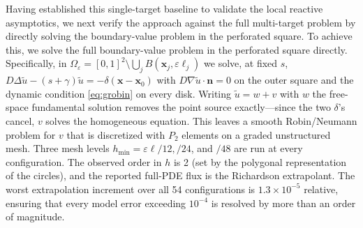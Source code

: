 \documentclass[pdflatex,sn-mathphys-num]{sn-jnl}
\numberwithin{equation}{section}
\theoremstyle{thmstyleone}%
\theoremstyle{definition}
\theoremstyle{remark}
\begin{document}
Having established this single-target baseline to validate the local reactive asymptotics, we next verify the approach against the full multi-target problem by directly solving the boundary-value problem in the perforated square. To achieve this, we solve the full boundary-value problem in the perforated square directly. Specifically, in $\Omega_\varepsilon=[0,1]^2\setminus\bigcup_j B(\mathbf x_j,\varepsilon\ell_j)$ we solve, at fixed $s$, $D\Delta\widetilde u-(s+\gamma)\widetilde u=-\delta(\mathbf x-\mathbf x_0)$ with $D\nabla\widetilde u\cdot\mathbf n=0$ on the outer square and the dynamic condition \eqref{eq:grobin} on every disk. Writing $\widetilde u=w+v$ with $w$ the free-space fundamental solution removes the point source exactly—since the two $\delta$'s cancel, $v$ solves the homogeneous equation. This leaves a smooth Robin/Neumann problem for $v$ that is discretized with $P_2$ elements on a graded unstructured mesh. Three mesh levels $h_{\min}=\varepsilon\ell/12, /24$, and $/48$ are run at every configuration. The observed order in $h$ is 2 (set by the polygonal representation of the circles), and the reported full-PDE flux is the Richardson extrapolant. The worst extrapolation increment over all 54 configurations is $1.3\times10^{-5}$ relative, ensuring that every model error exceeding $10^{-4}$ is resolved by more than an order of magnitude. 
\end{document}
